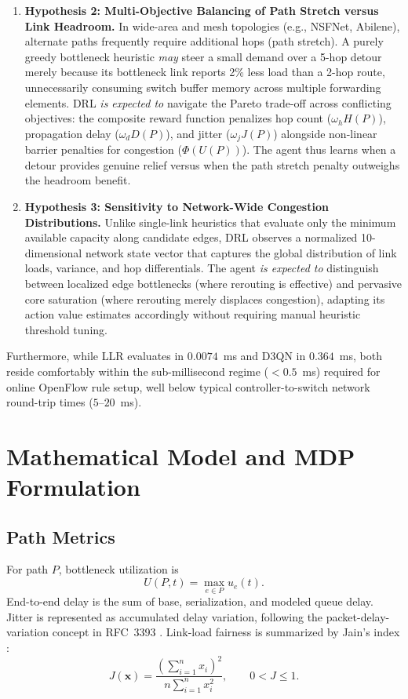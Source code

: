 \documentclass[12pt,a4paper,oneside]{report}
\begin{document}
\begin{enumerate}
  \item \textbf{Hypothesis 2: Multi-Objective Balancing of Path Stretch versus Link Headroom.} In wide-area and mesh topologies (e.g., NSFNet, Abilene), alternate paths frequently require additional hops (path stretch). A purely greedy bottleneck heuristic \emph{may} steer a small demand over a 5-hop detour merely because its bottleneck link reports 2\% less load than a 2-hop route, unnecessarily consuming switch buffer memory across multiple forwarding elements. DRL \emph{is expected to} navigate the Pareto trade-off across conflicting objectives: the composite reward function penalizes hop count ($\omega_h H(P)$), propagation delay ($\omega_d D(P)$), and jitter ($\omega_j J(P)$) alongside non-linear barrier penalties for congestion ($\Phi(U(P))$). The agent thus learns when a detour provides genuine relief versus when the path stretch penalty outweighs the headroom benefit.

  \item \textbf{Hypothesis 3: Sensitivity to Network-Wide Congestion Distributions.} Unlike single-link heuristics that evaluate only the minimum available capacity along candidate edges, DRL observes a normalized 10-dimensional network state vector that captures the global distribution of link loads, variance, and hop differentials. The agent \emph{is expected to} distinguish between localized edge bottlenecks (where rerouting is effective) and pervasive core saturation (where rerouting merely displaces congestion), adapting its action value estimates accordingly without requiring manual heuristic threshold tuning.
\end{enumerate}

Furthermore, while LLR evaluates in $0.0074$~ms and D3QN in $0.364$~ms, both reside comfortably within the sub-millisecond regime ($<0.5$~ms) required for online OpenFlow rule setup, well below typical controller-to-switch network round-trip times ($5$--$20$~ms).

\chapter{Mathematical Model and MDP Formulation}
\label{chap:model}

\section{Path Metrics}
For path $P$, bottleneck utilization is
\begin{equation}
U(P,t)=\max_{e\in P}u_e(t).
\end{equation}
End-to-end delay is the sum of base, serialization, and modeled queue delay. Jitter is represented as accumulated delay variation, following the packet-delay-variation concept in RFC~3393 \cite{demichelis2002ippm}. Link-load fairness is summarized by Jain's index \cite{jain1984fairness}:
\begin{equation}
J(\mathbf{x})=\frac{(\sum_{i=1}^{n}x_i)^2}{n\sum_{i=1}^{n}x_i^2},\qquad 0<J\le1.
\end{equation}
\end{document}
